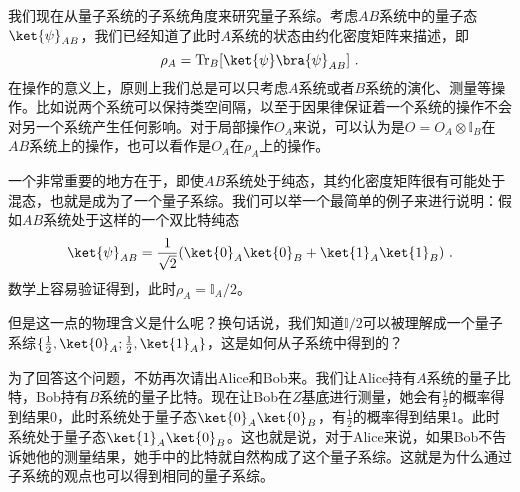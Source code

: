 
我们现在从量子系统的子系统角度来研究量子系综。考虑$AB$系统中的量子态$\ket{\psi}_{AB}$，我们已经知道了此时$A$系统的状态由约化密度矩阵来描述，即
\begin{equation}
\rho_A=\operatorname{Tr}_B[\ket{\psi}\bra{\psi}_{AB}]~.
\end{equation}
在操作的意义上，原则上我们总是可以只考虑$A$系统或者$B$系统的演化、测量等操作。比如说两个系统可以保持类空间隔，以至于因果律保证着一个系统的操作不会对另一个系统产生任何影响。对于局部操作$O_A$来说，可以认为是$O=O_A\otimes\mathbb{I}_B$在$AB$系统上的操作，也可以看作是$O_A$在$\rho_A$上的操作。

一个非常重要的地方在于，即使$AB$系统处于纯态，其约化密度矩阵很有可能处于混态，也就是成为了一个量子系综。我们可以举一个最简单的例子来进行说明：假如$AB$系统处于这样的一个双比特纯态
\begin{equation}
\ket{\psi}_{AB}=\frac{1}{\sqrt{2}}(\ket{0}_A\ket{0}_B+\ket{1}_A\ket{1}_B)~.
\end{equation}
数学上容易验证得到，此时$\rho_A=\mathbb{I}_A/2$。

但是这一点的物理含义是什么呢？换句话说，我们知道$\mathbb{I}/2$可以被理解成一个量子系综$\{\frac{1}{2},\ket{0}_A;\frac{1}{2},\ket{1}_A\}$，这是如何从子系统中得到的？

为了回答这个问题，不妨再次请出Alice和Bob来。我们让Alice持有$A$系统的量子比特，Bob持有$B$系统的量子比特。现在让Bob在$Z$基底进行测量，她会有$\frac{1}{2}$的概率得到结果0，此时系统处于量子态$\ket{0}_A\ket{0}_B$，有$\frac{1}{2}$的概率得到结果1。此时系统处于量子态$\ket{1}_A\ket{0}_B$。这也就是说，对于Alice来说，如果Bob不告诉她他的测量结果，她手中的比特就自然构成了这个量子系综。这就是为什么通过子系统的观点也可以得到相同的量子系综。



